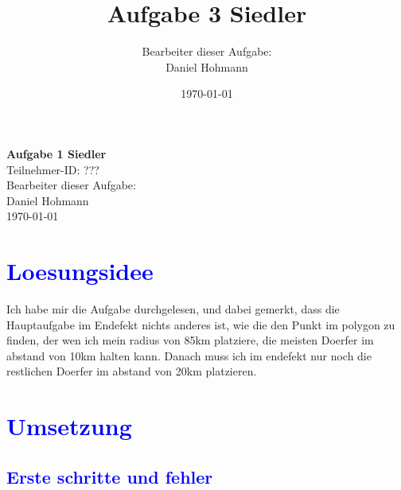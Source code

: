\documentclass{article}
\title{\Huge{\textbf{Aufgabe 3 Siedler}} \\ \centering{\LARGE{Teilnahme-ID: ?????}}}
\author{Bearbeiter dieser Aufgabe: \\ Daniel Hohmann}
\date{\today}
\begin{document}

\thispagestyle{empty}
\begin{center}
\Huge{\textbf{Aufgabe 1 Siedler}}
\\
\LARGE{Teilnehmer-ID: ???}
\\
\LARGE{Bearbeiter dieser Aufgabe: \\ Daniel Hohmann}
\\
\LARGE{\today}
\end{center}
\newpage
\setcounter{page}{1}
\tableofcontents
\newpage
\section{\textcolor{blue}{Loesungsidee}}
\begin{center}
Ich habe mir die Aufgabe durchgelesen, und dabei gemerkt, dass die Hauptaufgabe im Endefekt nichts anderes ist, wie die den Punkt im polygon zu finden, der wen ich mein radius von 85km platziere, die meisten Doerfer im abstand von 10km halten kann. Danach muss ich im endefekt nur noch die restlichen Doerfer im abstand von 20km platzieren.
\end{center}
\section{\textcolor{blue}{Umsetzung}}
\subsection{\textcolor{blue}{Erste schritte und fehler}}
\end{document}

